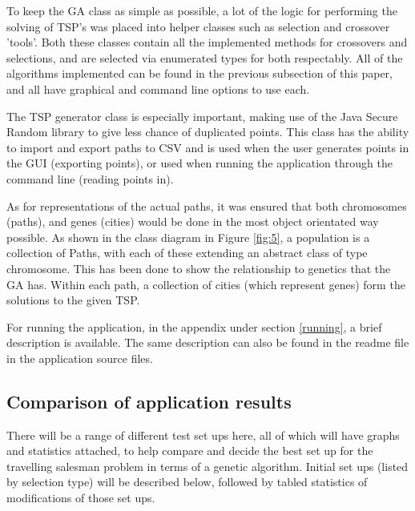 \documentclass[article]{IEEEtran}
\begin{document}
To keep the GA class as simple as possible, a lot of the logic for performing the solving of TSP's was placed into helper classes such as selection and crossover 'tools'. Both these classes contain all the implemented methods for crossovers and selections, and are selected via enumerated types for both respectably. All of the algorithms implemented can be found in the previous subsection of this paper, and all have graphical and command line options to use each. \par
The TSP generator class is especially important, making use of the Java Secure Random library to give less chance of duplicated points. This class has the ability to import and export paths to CSV and is used when the user generates points in the GUI (exporting points), or used when running the application through the command line (reading points in).\par
As for representations of the actual paths, it was ensured that both chromosomes (paths), and genes (cities) would be done in the most object orientated way possible. As shown in the class diagram in Figure \ref{fig:5}, a population is a collection of Paths, with each of these extending an abstract class of type chromosome. This has been done to show the relationship to genetics that the GA has. Within each path, a collection of cities (which represent genes) form the solutions to the given TSP. \par
For running the application, in the appendix under section \ref{running}, a brief description is available. The same description can also be found in the readme file in the application source files.

\subsection{Comparison of application results}
There will be a range of different test set ups here, all of which will have graphs and statistics attached, to help compare and decide the best set up for the travelling salesman problem in terms of a genetic algorithm. Initial set ups (listed by selection type) will be described below, followed by tabled statistics of modifications of those set ups.
\end{document}
